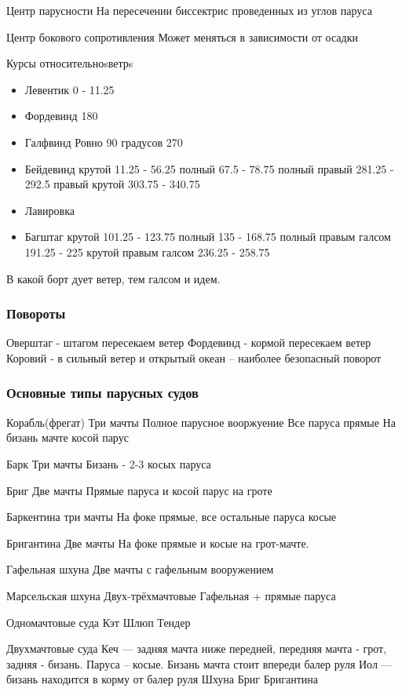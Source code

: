 \documentclass{article}        %
\begin{document}
\begin{description}
Центр парусности
На пересечении биссектрис проведенных из углов паруса

Центр бокового сопротивления
Может меняться в зависимости от осадки	

Курсы относительноsветрs

\begin{itemize}
\item Левентик
	0 - 11.25 
\item Фордевинд
	180 
\item Галфвинд
	Ровно 90 градусов
	270
\item Бейдевинд
	крутой 11.25 - 56.25
	полный 67.5 - 78.75
	полный правый 281.25 - 292.5
	правый крутой 303.75 - 340.75
\item Лавировка
\item Багштаг
	крутой 101.25 - 123.75
	полный 135 - 168.75
	полный правым галсом 191.25 - 225
	крутой правым галсом 236.25 - 258.75
\end{itemize}

В какой борт дует ветер, тем галсом и идем.

\subsubsection{Повороты}
Оверштаг - штагом пересекаем ветер
Фордевинд - кормой пересекаем ветер
Коровий - в сильный ветер и открытый океан -- наиболее безопасный поворот

\subsubsection{Основные типы парусных судов}
Корабль(фрегат)
Три мачты
Полное парусное вооржуение
Все паруса прямые
На бизань мачте косой парус

Барк
Три мачты
Бизань - 2-3 косых паруса

Бриг 
Две мачты
Прямые паруса и косой парус на гроте

Баркентина
три мачты
На фоке прямые, все остальные паруса косые

Бригантина
Две мачты
На фоке прямые и косые на грот-мачте.

Гафельная шхуна
Две мачты с гафельным вооружением

Марсельская шхуна
Двух-трёхмачтовые
Гафельная + прямые паруса



Одномачтовые суда
Кэт
Шлюп
Тендер

Двухмачтовые суда
Кеч --- задняя мачта ниже передней, передняя мачта - грот, задняя - бизань. Паруса -- косые. Бизань мачта стоит впереди балер руля
Иол --- бизань находится в корму от балер руля 
Шхуна
Бриг
Бригантина


\end{description}
\end{document}
